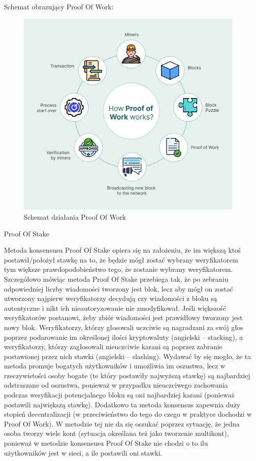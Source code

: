 Schemat obrazujący Proof Of Work:
\begin{figure}[H]
    \centering
    \includegraphics[width=\textwidth]{Images/ConsesnsusProofOfWork.png}
    \caption{Schemat działania Proof Of Work}
    \label{fig:ConsesnsusProofOfWork}
\end{figure}
Proof Of Stake

\vspace{1em}

Metoda konsensusu Proof Of Stake opiera się na założeniu, że im większą ktoś postawił/położył stawkę na to, że będzie mógł zostać wybrany weryfikatorem tym większe prawdopodobieństwo tego, że zostanie wybrany weryfikatorem. Szczegółowo mówiąc metoda Proof Of Stake przebiega tak, że po zebraniu odpowiedniej liczby wiadomości tworzony jest blok, lecz aby mógł on zostać utworzony najpierw weryfikatorzy decydują czy wiadomości z bloku są autentyczne i nikt ich nieautoryzowanie nie zmodyfikował. Jeśli większość weryfikatorów postanowi, żeby zbiór wiadomości jest prawidłowy tworzony jest nowy blok. Weryfikatorzy, którzy głosowali uczciwie są nagradzani za swój głos poprzez podarowanie im określonej ilości kryptowaluty (angielski – stacking), a weryfikatorzy, którzy zagłosowali nieuczciwie karani są poprzez zabranie postawionej przez nich stawki (angielski – slashing). Wydawać by się mogło, że ta metoda promuje bogatych użytkowników i umożliwia im oszustwa, lecz w rzeczywistości osoby bogate (te który postawiły najwyższą stawkę) są najbardziej odstraszane od oszustwa, ponieważ w przypadku nieuczciwego zachowania podczas weryfikacji potencjalnego bloku są oni najbardziej karani (ponieważ postawili największą stawkę). Dodatkowo ta metoda konsensus zapewnia duży stopień decentralizacji (w przeciwieństwo do tego do czego w praktyce dochodzi w Proof Of Work). W metodzie tej nie da się oszukać poprzez sytuację, że jedna osoba tworzy wiele kont (sytuacja określana też jako tworzenie multikont), ponieważ w metodzie konsensusu Proof Of Stake nie chodzi o to ilu użytkowników jest w sieci, a ile postawili oni stawki.

